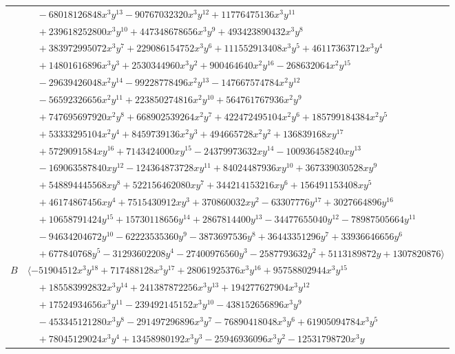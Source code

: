 \documentclass[11pt]{article}
\begin{document}
\begin{longtable}{@{}ll@{}}
 & $\quad -68018126848x^{3}y^{13}-90767032320x^{3}y^{12}+11776475136x^{3}y^{11}$\\
 & $\quad +239618252800x^{3}y^{10}+447348678656x^{3}y^{9}+493423890432x^{3}y^{8}$\\
 & $\quad +383972995072x^{3}y^{7}+229086154752x^{3}y^{6}+111552913408x^{3}y^{5}+46117363712x^{3}y^{4}$\\
 & $\quad +14801616896x^{3}y^{3}+2530344960x^{3}y^{2}+900464640x^{2}y^{16}-268632064x^{2}y^{15}$\\
 & $\quad -29639426048x^{2}y^{14}-99228778496x^{2}y^{13}-147667574784x^{2}y^{12}$\\
 & $\quad -56592326656x^{2}y^{11}+223850274816x^{2}y^{10}+564761767936x^{2}y^{9}$\\
 & $\quad +747695697920x^{2}y^{8}+668902539264x^{2}y^{7}+422472495104x^{2}y^{6}+185799184384x^{2}y^{5}$\\
 & $\quad +53333295104x^{2}y^{4}+8459739136x^{2}y^{3}+494665728x^{2}y^{2}+136839168xy^{17}$\\
 & $\quad +5729091584xy^{16}+7143424000xy^{15}-24379973632xy^{14}-100936458240xy^{13}$\\
 & $\quad -169063587840xy^{12}-124364873728xy^{11}+84024487936xy^{10}+367339030528xy^{9}$\\
 & $\quad +548894445568xy^{8}+522156462080xy^{7}+344214153216xy^{6}+156491153408xy^{5}$\\
 & $\quad +46174867456xy^{4}+7515430912xy^{3}+370860032xy^{2}-63307776y^{17}+3027664896y^{16}$\\
 & $\quad +10658791424y^{15}+15730118656y^{14}+2867814400y^{13}-34477655040y^{12}-78987505664y^{11}$\\
 & $\quad -94634204672y^{10}-62223535360y^{9}-3873697536y^{8}+36443351296y^{7}+33936646656y^{6}$\\
 & $\quad +677840768y^{5}-31293602208y^{4}-27400976560y^{3}-2587793632y^{2}+5113189872y+1307820876\rangle$\\
$B$ & $\langle -51904512x^{3}y^{18}+717488128x^{3}y^{17}+28061925376x^{3}y^{16}+95758802944x^{3}y^{15}$\\
 & $\quad +185583992832x^{3}y^{14}+241387872256x^{3}y^{13}+194277627904x^{3}y^{12}$\\
 & $\quad +17524934656x^{3}y^{11}-239492145152x^{3}y^{10}-438152656896x^{3}y^{9}$\\
 & $\quad -453345121280x^{3}y^{8}-291497296896x^{3}y^{7}-76890418048x^{3}y^{6}+61905094784x^{3}y^{5}$\\
 & $\quad +78045129024x^{3}y^{4}+13458980192x^{3}y^{3}-25946936096x^{3}y^{2}-12531798720x^{3}y$\\

\end{longtable}
\end{document}
